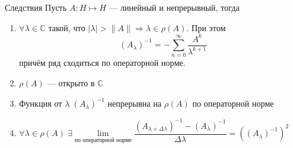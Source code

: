 \documentclass[14pt]{extarticle}
\begin{document}
\begin{MathCl}{Следствия}
    Пусть $A : H \mapsto H$ --- линейный и непрерывный, тогда
    \begin{enumerate}
        \item{$\forall \lambda \in \mathbb C$ такой, что $|\lambda| > \|A\| \Rightarrow  \lambda \in \rho(A)$.
            При этом 
            $$
            (A_\lambda)^{-1} = -\sum \limits_{n = 0}^{\infty}\dfrac{A^k}{\lambda^{k+1}}
            $$
            причём ряд сходиться по операторной норме.}
        \item{$\rho(A)$ --- открыто в $\mathbb C$}
        \item{Функция от $\lambda\; (A_\lambda)^{-1}$ непрерывна на $\rho(A)$ по операторной норме}
        \item{$\forall \lambda \in \rho(A)\; \exists \lim\limits_{\text{по операторной норме}}\dfrac{(A_{\lambda + \Delta \lambda})^{-1} - (A_\lambda)^{-1}}{\Delta\lambda} =
            ((A_\lambda)^{-1})^2$}
    \end{enumerate}
\end{MathCl}
\end{document}
